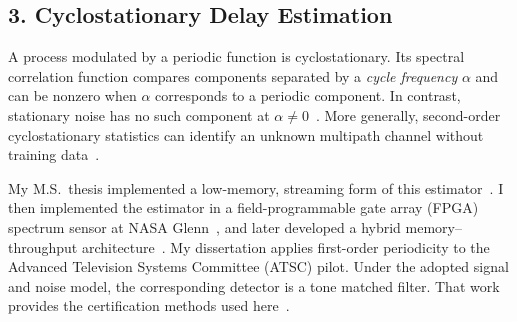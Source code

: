 \documentclass[12pt]{article}
\begin{document}
\subsection*{3. Cyclostationary Delay Estimation}

A process modulated by a periodic function is cyclostationary. Its spectral correlation function compares components separated by a \emph{cycle frequency} $\alpha$ and can be nonzero when $\alpha$ corresponds to a periodic component. In contrast, stationary noise has no such component at $\alpha\ne0$~\cite[Sec.~3.2.1; Eqs.~(3.6)--(3.11), (3.19), pp.~643--645; Sec.~3.7, Eqs.~(3.88)--(3.95), pp.~651--652]{gardner2006}. More generally, second-order cyclostationary statistics can identify an unknown multipath channel without training data~\cite[Abstract, p.~340; Secs.~I.B--I.C; Eqs.~(1)--(2), p.~341]{tong1994}.

My M.S.\ thesis implemented a low-memory, streaming form of this estimator~\cite[Abstract, p.~vii; Sec.~3.2, pp.~27--29]{gormley2021thesis}. I then implemented the estimator in a field-programmable gate array (FPGA) spectrum sensor at NASA Glenn~\cite[Sec.~II; Figs.~7--9, p.~3; Sec.~III, Table~II, pp.~3--4]{gormley2021}, and later developed a hybrid memory--throughput architecture~\cite[pp.~34--36]{gormley2023}. My dissertation applies first-order periodicity to the Advanced Television Systems Committee (ATSC) pilot. Under the adopted signal and noise model, the corresponding detector is a tone matched filter. That work provides the certification methods used here~\cite{gormley2026a}.
\end{document}
